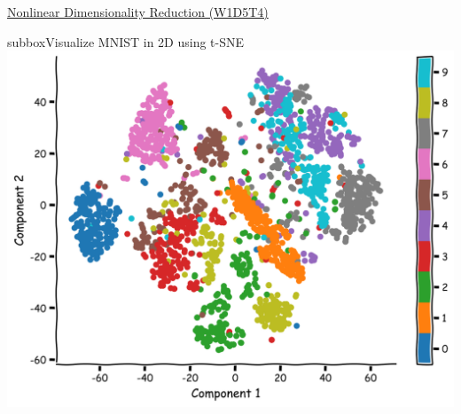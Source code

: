 \begin{textbox}{\href{https://compneuro.neuromatch.io/tutorials/W1D5_DimensionalityReduction/student/W1D5_Tutorial4.html}{ Nonlinear Dimensionality Reduction (W1D5T4)} }
\begin{subbox}{subbox}{Visualize MNIST in 2D using t-SNE}
\centering
\includegraphics[scale=0.15]{Figures/DM/DMFigure6.png}

\end{subbox}

\end{textbox}